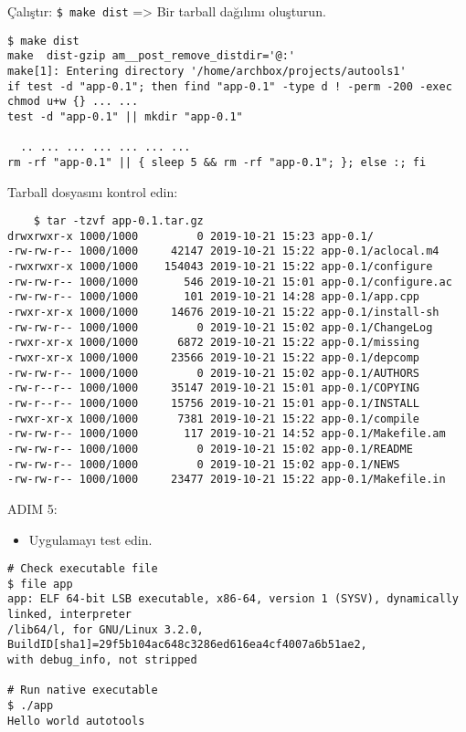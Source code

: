 \documentclass[
]{book}
\providecommand{\tightlist}{%
  \setlength{\itemsep}{0pt}\setlength{\parskip}{0pt}}
\begin{document}
Çalıştır: \texttt{\$\ make\ dist} =\textgreater{} Bir tarball dağılımı oluşturun.

\begin{verbatim}
$ make dist
make  dist-gzip am__post_remove_distdir='@:'
make[1]: Entering directory '/home/archbox/projects/autools1'
if test -d "app-0.1"; then find "app-0.1" -type d ! -perm -200 -exec chmod u+w {} ... ... 
test -d "app-0.1" || mkdir "app-0.1"

  .. ... ... ... ... ... ... 
rm -rf "app-0.1" || { sleep 5 && rm -rf "app-0.1"; }; else :; fi
\end{verbatim}

Tarball dosyasını kontrol edin:

\begin{verbatim}
    $ tar -tzvf app-0.1.tar.gz 
drwxrwxr-x 1000/1000         0 2019-10-21 15:23 app-0.1/
-rw-rw-r-- 1000/1000     42147 2019-10-21 15:22 app-0.1/aclocal.m4
-rwxrwxr-x 1000/1000    154043 2019-10-21 15:22 app-0.1/configure
-rw-rw-r-- 1000/1000       546 2019-10-21 15:01 app-0.1/configure.ac
-rw-rw-r-- 1000/1000       101 2019-10-21 14:28 app-0.1/app.cpp
-rwxr-xr-x 1000/1000     14676 2019-10-21 15:22 app-0.1/install-sh
-rw-rw-r-- 1000/1000         0 2019-10-21 15:02 app-0.1/ChangeLog
-rwxr-xr-x 1000/1000      6872 2019-10-21 15:22 app-0.1/missing
-rwxr-xr-x 1000/1000     23566 2019-10-21 15:22 app-0.1/depcomp
-rw-rw-r-- 1000/1000         0 2019-10-21 15:02 app-0.1/AUTHORS
-rw-r--r-- 1000/1000     35147 2019-10-21 15:01 app-0.1/COPYING
-rw-r--r-- 1000/1000     15756 2019-10-21 15:01 app-0.1/INSTALL
-rwxr-xr-x 1000/1000      7381 2019-10-21 15:22 app-0.1/compile
-rw-rw-r-- 1000/1000       117 2019-10-21 14:52 app-0.1/Makefile.am
-rw-rw-r-- 1000/1000         0 2019-10-21 15:02 app-0.1/README
-rw-rw-r-- 1000/1000         0 2019-10-21 15:02 app-0.1/NEWS
-rw-rw-r-- 1000/1000     23477 2019-10-21 15:22 app-0.1/Makefile.in
\end{verbatim}

ADIM 5:

\begin{itemize}
\tightlist
\item
  Uygulamayı test edin.
\end{itemize}

\begin{verbatim}
# Check executable file 
$ file app
app: ELF 64-bit LSB executable, x86-64, version 1 (SYSV), dynamically linked, interpreter 
/lib64/l, for GNU/Linux 3.2.0, BuildID[sha1]=29f5b104ac648c3286ed616ea4cf4007a6b51ae2, 
with debug_info, not stripped

# Run native executable 
$ ./app
Hello world autotools
\end{verbatim}
\end{document}
